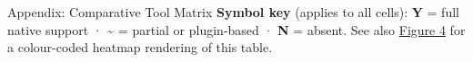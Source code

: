 \documentclass[
  ignorenonframetext,
]{beamer}
\author{\texorpdfstring{}{}}
\date{}
\begin{document}
\begin{frame}
\newpage
\end{frame}

\begin{frame}[fragile]{Appendix: Comparative Tool Matrix}
\protect{}\label{appendix-matrix}
\textbf{Symbol key} (applies to all cells): \textbf{Y} = full native
support · \textbf{\textasciitilde{}} = partial or plugin-based ·
\textbf{N} = absent. See also
\href{04_results.md\#comparative-feature-analysis}{Figure 4} for a
colour-coded heatmap rendering of this table.

\begin{table}[h]
\caption{Comparative feature matrix (14 capabilities $\times$ 10 tools). Y~=~full native support, \textasciitilde~=~partial or plugin-based, N~=~absent.}
\label{tab:comparative-matrix}
\end{table}


\end{frame}
\end{document}
